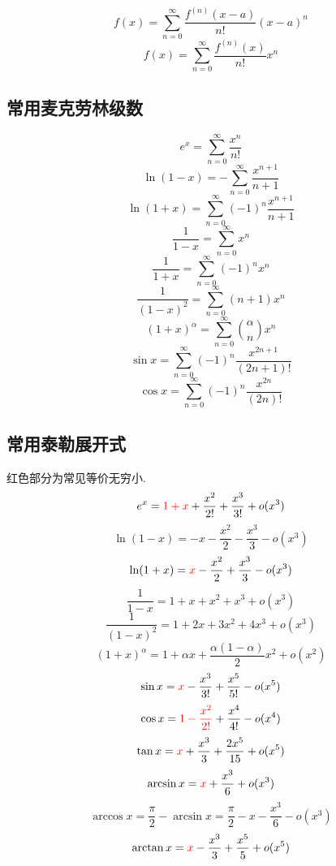 \documentclass[UTF8]{ctexart}
\begin{document}
\[ f(x) = \sum_{n = 0}^{\infty} \dfrac{f^{(n)}(x - a)}{n!} (x - a)^n  \]
\[ f(x) = \sum_{n = 0}^{\infty} \dfrac{f^{(n)}(x)}{n!} x^n  \]

\subsection*{常用麦克劳林级数}
\[ e^x = \sum_{n = 0}^{\infty} \dfrac{x^n}{n!}\]
\[ \ln(1 - x) = - \sum_{n = 0}^{\infty} \dfrac{x^{n+1}}{n + 1} \] 
\[ \ln(1 + x) = \sum_{n = 0}^{\infty} (-1)^n \dfrac{x^{n+1}}{n + 1} \] 
\[ \dfrac{1}{1 - x} = \sum_{n = 0}^{\infty} x^n \] 
\[ \dfrac{1}{1 + x} = \sum_{n = 0}^{\infty} (-1)^n x^n \] 
\[ \dfrac{1}{(1 - x)^2} = \sum_{n = 0}^{\infty} (n + 1)x^n \]
\[ (1 + x)^\alpha = \sum_{n = 0}^{\infty} \binom\alpha n x^n \] 
\[ \sin x = \sum_{n = 0}^{\infty}(-1)^n\dfrac{x^{2n + 1}}{(2n+1)!} \] 
\[ \cos x = \sum_{n = 0}^{\infty} (-1)^n \dfrac{x^{2n}}{(2n)!} \] 

\subsection*{常用泰勒展开式}
红色部分为常见等价无穷小.
\[ e^x = {\color{red} 1 + x} + \dfrac{x^2}{2!} + \dfrac{x^3}{3!} + o(x^3) \]
\[ \ln (1 - x) = - x - \dfrac{x^2}{2} - \dfrac{x^3}{3} - o(x^3) \]             
\[ \ln (1 + x) = {\color{red} x} - \dfrac{x^2}{2} + \dfrac{x^3}{3} - o(x^3) \]
\[ \dfrac{1}{1 - x} = 1 + x + x^2 + x^3 + o(x^3) \]
\[ \dfrac{1}{(1 - x)^2} = 1 + 2 x + 3 x^2 + 4 x^3 + o(x^3) \]
\[ (1 + x)^\alpha = 1 + \alpha x + \dfrac{\alpha(1 - \alpha)}{2}x^2 + o(x^2) \]
\[ \sin x = {\color{red} x} - \dfrac{x^3}{3!} + \dfrac{x^5}{5!} - o(x^5) \]
\[ \cos x = {\color{red} 1 - \dfrac{x^2}{2!}} + \dfrac{x^4}{4!} - o(x^4) \]
\[ \tan x = {\color{red} x} + \dfrac{x^3}{3} + \dfrac{2 x^5}{15} + o(x^5) \]
\[ \arcsin x = {\color{red} x} + \dfrac{x^3}{6} + o(x^3) \]
\[ \arccos x = \dfrac{\pi}{2} - \arcsin x = \dfrac{\pi}{2} - x - \dfrac{x^3}{6} - o(x^3) \]
\[ \arctan x = {\color{red} x} - \dfrac{x^3}{3} + \dfrac{x^5}{5} + o(x^5) \]
\end{document}
